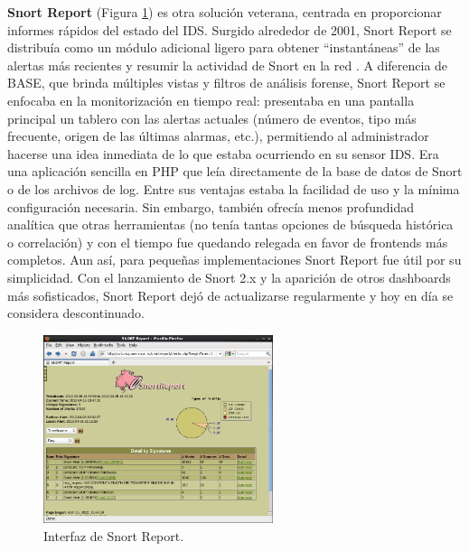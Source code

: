 \documentclass[11pt,a4paper,twoside]{report}
\begin{document}
\textbf{Snort Report} (Figura \ref{fig:snort-report}) es otra solución veterana, centrada en proporcionar informes rápidos del estado del IDS. Surgido alrededor de 2001, Snort Report se distribuía como un módulo adicional ligero para obtener “instantáneas” de las alertas más recientes y resumir la actividad de Snort en la red \cite{SnortReport2010}. A diferencia de BASE, que brinda múltiples vistas y filtros de análisis forense, Snort Report se enfocaba en la monitorización en tiempo real: presentaba en una pantalla principal un tablero con las alertas actuales (número de eventos, tipo más frecuente, origen de las últimas alarmas, etc.), permitiendo al administrador hacerse una idea inmediata de lo que estaba ocurriendo en su sensor IDS. Era una aplicación sencilla en PHP que leía directamente de la base de datos de Snort o de los archivos de log. Entre sus ventajas estaba la facilidad de uso y la mínima configuración necesaria. Sin embargo, también ofrecía menos profundidad analítica que otras herramientas (no tenía tantas opciones de búsqueda histórica o correlación) y con el tiempo fue quedando relegada en favor de frontends más completos. Aun así, para pequeñas implementaciones Snort Report fue útil por su simplicidad. Con el lanzamiento de Snort 2.x y la aparición de otros dashboards más sofisticados, Snort Report dejó de actualizarse regularmente y hoy en día se considera descontinuado.

\begin{figure}[H]
	\centering
	\includegraphics[width=0.6\textwidth]{documento/19.png}
	\caption{Interfaz de Snort Report.}
	\label{fig:snort-report}
\end{figure}
\end{document}
